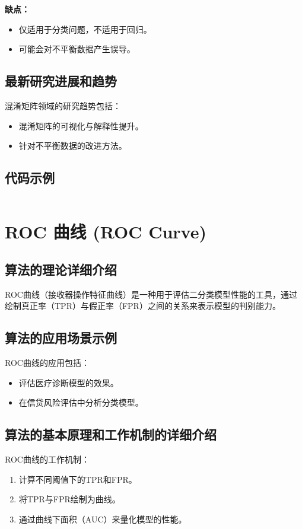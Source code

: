 \textbf{缺点：}
\begin{itemize}
    \item 仅适用于分类问题，不适用于回归。
    \item 可能会对不平衡数据产生误导。
\end{itemize}

\subsection*{最新研究进展和趋势}
混淆矩阵领域的研究趋势包括：
\begin{itemize}
    \item 混淆矩阵的可视化与解释性提升。
    \item 针对不平衡数据的改进方法。
\end{itemize}
\subsection*{代码示例}
\begin{lstlisting}

\end{lstlisting}


\section{ROC 曲线 (ROC Curve)}
\subsection*{算法的理论详细介绍}
ROC曲线（接收器操作特征曲线）是一种用于评估二分类模型性能的工具，通过绘制真正率（TPR）与假正率（FPR）之间的关系来表示模型的判别能力。

\subsection*{算法的应用场景示例}
ROC曲线的应用包括：
\begin{itemize}
    \item 评估医疗诊断模型的效果。
    \item 在信贷风险评估中分析分类模型。
\end{itemize}

\subsection*{算法的基本原理和工作机制的详细介绍}
ROC曲线的工作机制：
\begin{enumerate}
    \item 计算不同阈值下的TPR和FPR。
    \item 将TPR与FPR绘制为曲线。
    \item 通过曲线下面积（AUC）来量化模型的性能。
\end{enumerate}

